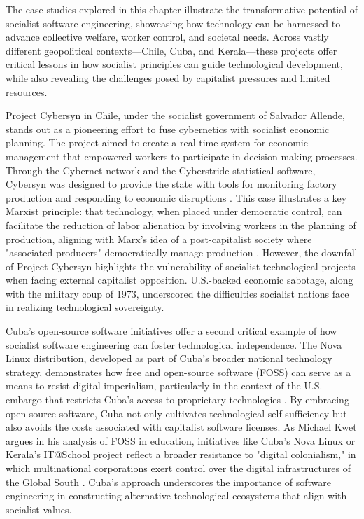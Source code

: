 \begin{refsection}
The case studies explored in this chapter illustrate the transformative potential of socialist software engineering, showcasing how technology can be harnessed to advance collective welfare, worker control, and societal needs. Across vastly different geopolitical contexts—Chile, Cuba, and Kerala—these projects offer critical lessons in how socialist principles can guide technological development, while also revealing the challenges posed by capitalist pressures and limited resources.

Project Cybersyn in Chile, under the socialist government of Salvador Allende, stands out as a pioneering effort to fuse cybernetics with socialist economic planning. The project aimed to create a real-time system for economic management that empowered workers to participate in decision-making processes. Through the Cybernet network and the Cyberstride statistical software, Cybersyn was designed to provide the state with tools for monitoring factory production and responding to economic disruptions \cite[pp.~187-189]{medina2014}. This case illustrates a key Marxist principle: that technology, when placed under democratic control, can facilitate the reduction of labor alienation by involving workers in the planning of production, aligning with Marx's idea of a post-capitalist society where "associated producers" democratically manage production \cite[pp.~326]{marx2008}. However, the downfall of Project Cybersyn highlights the vulnerability of socialist technological projects when facing external capitalist opposition. U.S.-backed economic sabotage, along with the military coup of 1973, underscored the difficulties socialist nations face in realizing technological sovereignty.

Cuba’s open-source software initiatives offer a second critical example of how socialist software engineering can foster technological independence. The Nova Linux distribution, developed as part of Cuba's broader national technology strategy, demonstrates how free and open-source software (FOSS) can serve as a means to resist digital imperialism, particularly in the context of the U.S. embargo that restricts Cuba’s access to proprietary technologies \cite[pp.~152-154]{feinberg2016}. By embracing open-source software, Cuba not only cultivates technological self-sufficiency but also avoids the costs associated with capitalist software licenses. As Michael Kwet argues in his analysis of FOSS in education, initiatives like Cuba's Nova Linux or Kerala’s IT@School project reflect a broader resistance to "digital colonialism," in which multinational corporations exert control over the digital infrastructures of the Global South \cite[pp.~29-31]{kwet2021}. Cuba’s approach underscores the importance of software engineering in constructing alternative technological ecosystems that align with socialist values.


\end{refsection}
